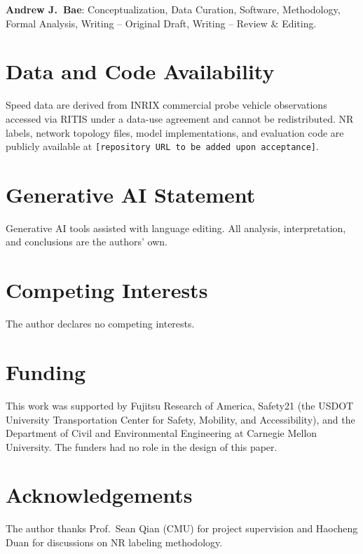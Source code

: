 \documentclass[a4paper]{cas-sc}
\begin{document}
\textbf{Andrew J.~Bae}: Conceptualization, Data Curation, Software,
Methodology, Formal Analysis, Writing -- Original Draft,
Writing -- Review \& Editing.

\section*{Data and Code Availability}

Speed data are derived from INRIX commercial probe vehicle
observations accessed via RITIS under a data-use agreement and
cannot be redistributed.
NR labels, network topology files, model implementations, and
evaluation code are publicly available at
\texttt{[repository URL to be added upon acceptance]}.

\section*{Generative AI Statement}

Generative AI tools assisted with language editing.
All analysis, interpretation, and conclusions are the authors' own.

\section*{Competing Interests}

The author declares no competing interests.

\section*{Funding}

This work was supported by Fujitsu Research of America, Safety21
(the USDOT University Transportation Center for Safety, Mobility,
and Accessibility), and the Department of Civil and Environmental
Engineering at Carnegie Mellon University.
The funders had no role in the design of this paper.

\section*{Acknowledgements}

The author thanks Prof.~Sean Qian (CMU) for project supervision
and Haocheng Duan for discussions on NR labeling methodology.

\appendix
\end{document}
